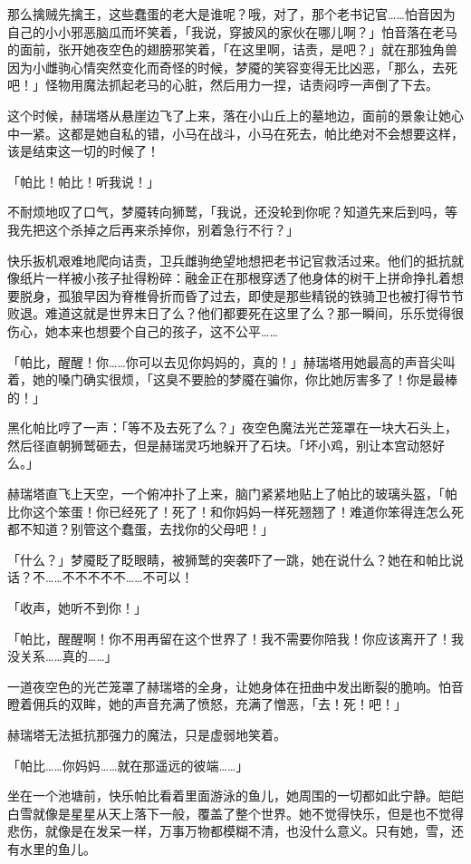 那么擒贼先擒王，这些蠢蛋的老大是谁呢？哦，对了，那个老书记官……怕音因为自己的小小邪恶脑瓜而坏笑着，「我说，穿披风的家伙在哪儿啊？」怕音落在老马的面前，张开她夜空色的翅膀邪笑着，「在这里啊，诘责，是吧？」就在那独角兽因为小雌驹心情突然变化而奇怪的时候，梦魇的笑容变得无比凶恶，「那么，去死吧！」怪物用魔法抓起老马的心脏，然后用力一捏，诘责闷哼一声倒了下去。

这个时候，赫瑞塔从悬崖边飞了上来，落在小山丘上的墓地边，面前的景象让她心中一紧。这都是她自私的错，小马在战斗，小马在死去，帕比绝对不会想要这样，该是结束这一切的时候了！

「帕比！帕比！听我说！」

不耐烦地叹了口气，梦魇转向狮鹫，「我说，还没轮到你呢？知道先来后到吗，等我先把这个杀掉之后再来杀掉你，别着急行不行？」

快乐扳机艰难地爬向诘责，卫兵雌驹绝望地想把老书记官救活过来。他们的抵抗就像纸片一样被小孩子扯得粉碎：融金正在那根穿透了他身体的树干上拼命挣扎着想要脱身，孤狼早因为脊椎骨折而昏了过去，即使是那些精锐的铁骑卫也被打得节节败退。难道这就是世界末日了么？他们都要死在这里了么？那一瞬间，乐乐觉得很伤心，她本来也想要个自己的孩子，这不公平……{}

「帕比，醒醒！你……你可以去见你妈妈的，真的！」赫瑞塔用她最高的声音尖叫着，她的嗓门确实很烦，「这臭不要脸的梦魇在骗你，你比她厉害多了！你是最棒的！」

黑化帕比哼了一声：「等不及去死了么？」夜空色魔法光芒笼罩在一块大石头上，然后径直朝狮鹫砸去，但是赫瑞灵巧地躲开了石块。「坏小鸡，别让本宫动怒好么。」

赫瑞塔直飞上天空，一个俯冲扑了上来，脑门紧紧地贴上了帕比的玻璃头盔，「帕比你这个笨蛋！你已经死了！死了！和你妈妈一样死翘翘了！难道你笨得连怎么死都不知道？别管这个蠢蛋，去找你的父母吧！」

「什么？」梦魇眨了眨眼睛，被狮鹫的突袭吓了一跳，她在说什么？她在和帕比说话？不……不不不不不……不可以！

「收声，她听不到你！」

「帕比，醒醒啊！你不用再留在这个世界了！我不需要你陪我！你应该离开了！我没关系……真的……」

一道夜空色的光芒笼罩了赫瑞塔的全身，让她身体在扭曲中发出断裂的脆响。怕音瞪着佣兵的双眸，她的声音充满了愤怒，充满了憎恶，「去！死！吧！」

赫瑞塔无法抵抗那强力的魔法，只是虚弱地笑着。

「帕比……你妈妈……就在那遥远的彼端……」

\horizonline

坐在一个池塘前，快乐帕比看着里面游泳的鱼儿，她周围的一切都如此宁静。皑皑白雪就像是星星从天上落下一般，覆盖了整个世界。她不觉得快乐，但是也不觉得悲伤，就像是在发呆一样，万事万物都模糊不清，也没什么意义。只有她，雪，还有水里的鱼儿。

